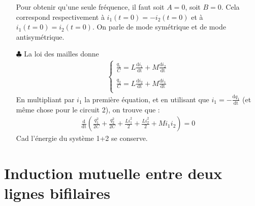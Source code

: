 \documentclass{report}
\begin{document}
\begin{itemize}
	Pour obtenir qu'une seule fréquence, il faut soit $A=0$, soit $B=0$. Cela correspond respectivement à $i_1(t=0)=-i_2(t=0)$ et à $i_1(t=0)=i_2(t=0)$. On parle de mode symétrique et de mode antisymétrique. 
	
	\item[$\clubsuit$] La loi des mailles donne
		\begin{align*}
	\left\lbrace
	\begin{array}{ccc}
	\frac{q_1}{C}=L\frac{\mathrm{d}i_1}{\mathrm{dt}}+M\frac{\mathrm{d}i_2}{\mathrm{dt}}\\
	\\
	\frac{q_2}{C}=L\frac{\mathrm{d}i_2}{\mathrm{dt}}+M\frac{\mathrm{d}i_1}{\mathrm{dt}}\\
	\end{array}\right.
	\end{align*}		
En multipliant par $i_1$ la première équation, et en utilisant que $i_1=-\frac{\mathrm{d}q_1}{\mathrm{dt}}$ (et même chose pour le circuit 2), on trouve que :
\begin{align*}
	\frac{\mathrm{d}}{\mathrm{dt}}\left(\frac{q_1^2}{2C}+\frac{q_2^2}{2C}+\frac{Li_1^2}{2}+\frac{Li_2^2}{2}+Mi_1i_2 \right) =0
\end{align*}
Cad l'énergie du système 1+2 se conserve.
	 
\end{itemize}

\section*{Induction mutuelle entre deux lignes bifilaires}
\end{document}
